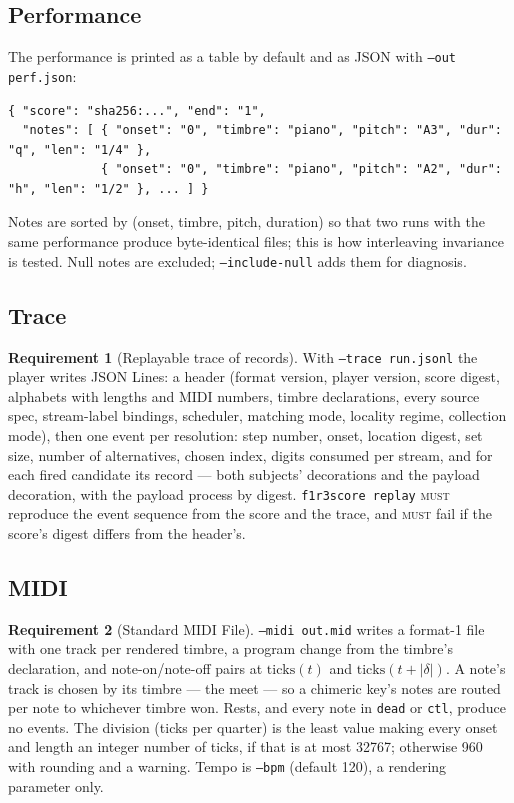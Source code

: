 \documentclass[11pt,a4paper]{article}
\theoremstyle{definition}
\newtheorem{requirement}{Requirement}[section]
\theoremstyle{remark}
\newcommand{\len}[1]{|#1|}
\newcommand{\MUST}{\textsc{must}}
\begin{document}
\subsection{Performance}

The performance is printed as a table by default and as JSON with
\texttt{--out perf.json}:
\begin{lstlisting}
{ "score": "sha256:...", "end": "1",
  "notes": [ { "onset": "0", "timbre": "piano", "pitch": "A3", "dur": "q", "len": "1/4" },
             { "onset": "0", "timbre": "piano", "pitch": "A2", "dur": "h", "len": "1/2" }, ... ] }
\end{lstlisting}
Notes are sorted by (onset, timbre, pitch, duration) so that two runs with the
same performance produce byte-identical files; this is how interleaving
invariance is tested. Null notes are excluded; \texttt{--include-null} adds them
for diagnosis.

\subsection{Trace}

\begin{requirement}[Replayable trace of records]\label{req:trace}
With \texttt{--trace run.jsonl} the player writes JSON Lines: a header (format
version, player version, score digest, alphabets with lengths and MIDI numbers,
timbre declarations, every source spec, stream-label bindings, scheduler,
matching mode, locality regime, collection mode), then one event per
resolution: step number, onset, location digest, set size, number of
alternatives, chosen index, digits consumed per stream, and for each fired
candidate its record --- both subjects' decorations and the payload decoration,
with the payload process by digest. \texttt{f1r3score replay} \MUST{} reproduce
the event sequence from the score and the trace, and \MUST{} fail if the score's
digest differs from the header's.
\end{requirement}

\subsection{MIDI}

\begin{requirement}[Standard MIDI File]\label{req:midi}
\texttt{--midi out.mid} writes a format-1 file with one track per rendered
timbre, a program change from the timbre's declaration, and note-on/note-off
pairs at $\mathrm{ticks}(t)$ and $\mathrm{ticks}(t+\len\delta)$. A note's track
is chosen by its timbre --- the meet --- so a chimeric key's notes are routed per
note to whichever timbre won. Rests, and every note in \texttt{dead} or
\texttt{ctl}, produce no events. The division (ticks per quarter) is the least
value making every onset and length an integer number of ticks, if that is at
most 32767; otherwise 960 with rounding and a warning. Tempo is \texttt{--bpm}
(default 120), a rendering parameter only.
\end{requirement}
\end{document}
